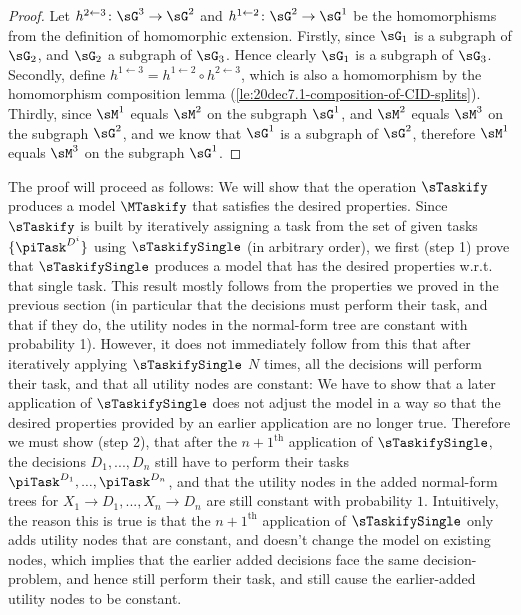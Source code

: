 \begin{proof} Let $h^{2\gets 3}\colon \sG^3\to \sG^2$ and $h^{1\gets 2}\colon \sG^2\to \sG^1$ be the homomorphisms from the definition of homomorphic extension.
Firstly, since $\sG_1$ is a subgraph of $\sG_2$, and $\sG_2$ a subgraph of $\sG_3$. Hence clearly $\sG_1$ is a subgraph of $\sG_3$. Secondly, define $h^{1 \gets 3} = h^{1\gets 2} \circ h^{2\gets 3}$, which is also a homomorphism by the homomorphism composition lemma (\autoref{le:20dec7.1-composition-of-CID-splits}). Thirdly, since $\sM^1$ equals $\sM^2$ on the subgraph $\sG^1$, and $\sM^2$ equals $\sM^3$ on the subgraph $\sG^2$, and we know that $\sG^1$ is a subgraph of $\sG^2$, therefore $\sM^1$ equals $\sM^3$ on the subgraph $\sG^1$.
\end{proof}






The proof will proceed as follows: We will show that the operation $\sTaskify$ produces a model $\MTaskify$ that satisfies the desired properties. Since $\sTaskify$ is built by iteratively 
assigning a task from the set of given tasks $\{\piTask^{D^i}\}$ using $\sTaskifySingle$ (in arbitrary order), we first (step 1) prove that $\sTaskifySingle$ produces a model that has the desired 
properties w.r.t. that single task. This result mostly follows from the properties we proved in the previous section (in particular that the decisions must perform their task, and that if they do, the utility nodes in the normal-form tree are constant with probability 1). However, it does not immediately follow from this 
that after iteratively applying $\sTaskifySingle$ $N$ times, all the decisions will perform their task, and that all utility nodes 
are constant: We have to show that a later application of $\sTaskifySingle$ does not adjust the model in a way so that the desired properties provided by an earlier application are no 
longer true. Therefore we must show (step 2), that after the $n+1^{\mathrm{th}}$ application of $\sTaskifySingle$, the decisions $D_1,...,D_n$ still have to perform their tasks 
$\piTask^{D_1},...,\piTask^{D_n}$, and that the utility nodes in the added normal-form trees for $X_1 \to D_1,...,X_n \to D_n$ are still constant with probability $1$. Intuitively, the reason this is true is that the $n+1^\text{th}$ application of $\sTaskifySingle$ only adds utility nodes that are constant, and doesn't change the model on existing nodes, which implies that the earlier added decisions face the same decision-problem, and hence still perform their task, and still cause the earlier-added utility nodes to be constant.



